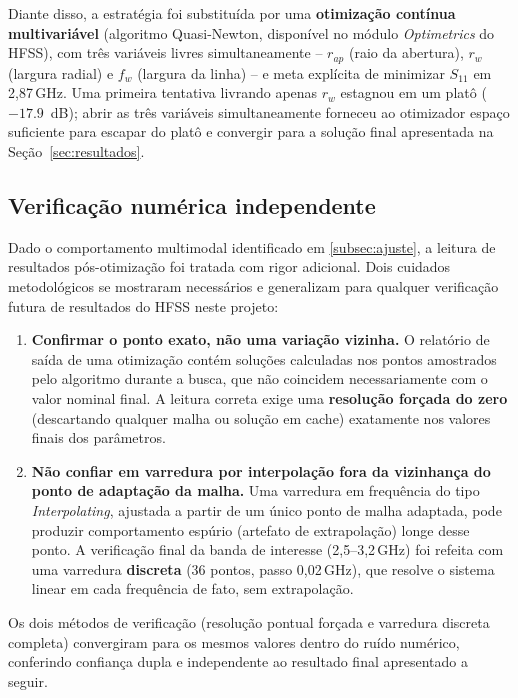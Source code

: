 \documentclass[10pt,a4paper,twocolumn]{article}
\begin{document}
Diante disso, a estrat\'egia foi substitu\'ida por uma
\textbf{otimiza\c{c}\~ao cont\'inua multivari\'avel} (algoritmo
Quasi-Newton, dispon\'ivel no m\'odulo \emph{Optimetrics} do HFSS),
com tr\^es vari\'aveis livres simultaneamente -- $r_{ap}$ (raio da
abertura), $r_w$ (largura radial) e $f_w$ (largura da linha) -- e meta
expl\'icita de minimizar $S_{11}$ em 2,87\,GHz. Uma
primeira tentativa livrando apenas $r_w$ estagnou em um plat\^o
($-17.9$~dB); abrir as tr\^es vari\'aveis simultaneamente forneceu ao
otimizador espa\c{c}o suficiente para escapar do plat\^o e convergir
para a solu\c{c}\~ao final apresentada na
Se\c{c}\~ao~\ref{sec:resultados}.

\subsection{Verifica\c{c}\~ao num\'erica independente}
\label{subsec:verificacao}

Dado o comportamento multimodal identificado em
\ref{subsec:ajuste}, a leitura de resultados p\'os-otimiza\c{c}\~ao foi
tratada com rigor adicional. Dois cuidados metodol\'ogicos se
mostraram necess\'arios e generalizam para qualquer verifica\c{c}\~ao
futura de resultados do HFSS neste projeto:

\begin{enumerate}
	\item \textbf{Confirmar o ponto exato, n\~ao uma varia\c{c}\~ao
	vizinha.} O relat\'orio de sa\'ida de uma otimiza\c{c}\~ao cont\'em
	solu\c{c}\~oes calculadas nos pontos amostrados pelo algoritmo
	durante a busca, que n\~ao coincidem necessariamente com o valor
	nominal final. A leitura correta exige uma \textbf{resolu\c{c}\~ao
	for\c{c}ada do zero} (descartando qualquer malha ou solu\c{c}\~ao
	em cache) exatamente nos valores finais dos par\^ametros.
	\item \textbf{N\~ao confiar em varredura por interpola\c{c}\~ao
	fora da vizinhan\c{c}a do ponto de adapta\c{c}\~ao da malha.} Uma
	varredura em frequ\^encia do tipo \emph{Interpolating}, ajustada a
	partir de um \'unico ponto de malha adaptada, pode produzir
	comportamento esp\'urio (artefato de extrapola\c{c}\~ao) longe desse
	ponto. A verifica\c{c}\~ao final da banda de interesse
	(2,5--3,2\,GHz) foi refeita com uma varredura
	\textbf{discreta} (36 pontos, passo 0,02\,GHz), que
	resolve o sistema linear em cada frequ\^encia de fato, sem
	extrapola\c{c}\~ao.
\end{enumerate}

Os dois m\'etodos de verifica\c{c}\~ao (resolu\c{c}\~ao pontual
for\c{c}ada e varredura discreta completa) convergiram para os mesmos
valores dentro do ru\'ido num\'erico, conferindo confian\c{c}a dupla e
independente ao resultado final apresentado a seguir.
\end{document}
